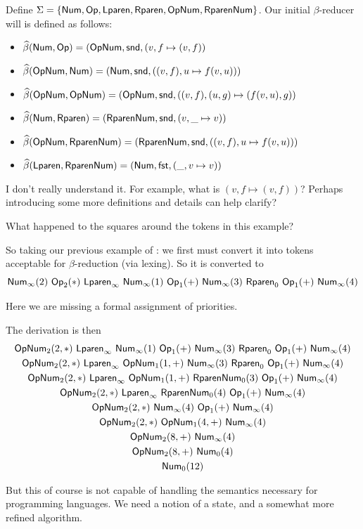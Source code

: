 \documentclass{llncs}
\newcounter{algo}
\newcommand{\yoni}[1]{{\begin{mdframed}[linecolor=red]{\color{red}#1}\end{mdframed}}}
\begin{document}
\begin{example}
Define $\Sigma=\set{\NUM,\OP,\LPAREN,\RPAREN,\OP\NUM,\RPAREN\NUM}$.
Our initial $\beta$-reducer will is defined as follows:
\begin{itemize}
    \item $\widehat\beta(\mathsf{Num},\mathsf{Op})=(\mathsf{Op}\mathsf{Num},\mathsf{snd},(v,f\mapsto(v,f))$
    \item $\widehat\beta(\mathsf{Op}\mathsf{Num},\mathsf{Num})=(\mathsf{Num},\mathsf{snd},((v,f),u\mapsto f(v,u)))$
    \item $\widehat\beta(\mathsf{Op}\mathsf{Num},\mathsf{Op}\mathsf{Num})=(\mathsf{Op}\mathsf{Num},\mathsf{snd},((v,f),(u,g)\mapsto (f(v,u),g))$
    \item $\widehat\beta(\mathsf{Num},\mathsf{Rparen})=(\mathsf{Rparen}\mathsf{Num},\mathsf{snd},(v,\_\mapsto v))$
    \item $\widehat\beta(\mathsf{Op}\mathsf{Num},\mathsf{Rparen}\mathsf{Num})=(\mathsf{Rparen}\mathsf{Num},\mathsf{snd},((v,f),u\mapsto f(v,u)))$
    \item $\widehat\beta(\mathsf{Lparen},\mathsf{Rparen}\mathsf{Num})=(\mathsf{Num},\mathsf{fst},(\_,v\mapsto v))$
\end{itemize}

\yoni{I don't really understand it. For example, what is 
$(v,f\mapsto(v,f))$? Perhaps introducing some more definitions
and details can help clarify?
}
\yoni{What happened to the squares around the tokens in this example?}



So taking our previous example of : we first must convert it into tokens acceptable for $\beta$-reduction (via lexing).
So it is converted to
\[ \NUM_\infty(2)\ \OP_2(*)\ \LPAREN_\infty\ \NUM_\infty(1)\ \OP_1(+)\ \NUM_\infty(3)\ \RPAREN_0\ \OP_1(+)\ \NUM_\infty(4) \]

\yoni{Here we are missing a formal assignment of priorities.}

The derivation is then
\begin{gather*}
    \OP\NUM_2(2,*)\ \LPAREN_\infty\ \NUM_\infty(1)\ \OP_1(+)\ \NUM_\infty(3)\ \RPAREN_0\ \OP_1(+)\ \NUM_\infty(4) \\
    \OP\NUM_2(2,*)\ \LPAREN_\infty\ \OP\NUM_1(1,+)\ \NUM_\infty(3)\ \RPAREN_0\ \OP_1(+)\ \NUM_\infty(4) \\
    \OP\NUM_2(2,*)\ \LPAREN_\infty\ \OP\NUM_1(1,+)\ \RPAREN\NUM_0(3)\ \OP_1(+)\ \NUM_\infty(4) \\
    \OP\NUM_2(2,*)\ \LPAREN_\infty\ \RPAREN\NUM_0(4)\ \OP_1(+)\ \NUM_\infty(4) \\
    \OP\NUM_2(2,*)\ \NUM_\infty(4)\ \OP_1(+)\ \NUM_\infty(4) \\
    \OP\NUM_2(2,*)\ \OP\NUM_1(4,+)\ \NUM_\infty(4) \\
    \OP\NUM_2(8,+)\ \NUM_\infty(4) \\
    \OP\NUM_2(8,+)\ \NUM_0(4) \\
    \NUM_0(12)
\end{gather*}

\end{example}
But this of course is not capable of handling the semantics necessary for programming languages.
We need a notion of a state, and a somewhat more refined algorithm.
\end{document}
